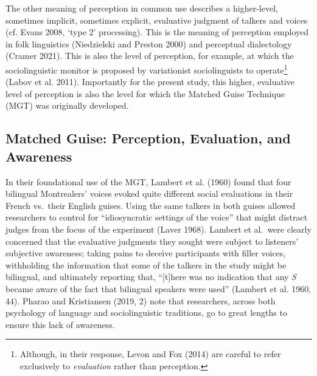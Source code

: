 \documentclass[
  letterpaper,
  DIV=11,
  numbers=noendperiod]{scrartcl}
\begin{document}
The other meaning of perception in common use describes a higher-level,
sometimes implicit, sometimes explicit, evaluative judgment of talkers
and voices (cf. Evans 2008, `type 2' processing). This is the meaning of
perception employed in folk linguistics (Niedzielski and Preston 2000)
and perceptual dialectology (Cramer 2021). This is also the level of
perception, for example, at which the sociolinguistic monitor is
proposed by variationist sociolinguists to operate\footnote{Although, in
  their response, Levon and Fox (2014) are careful to refer exclusively
  to \emph{evaluation} rather than perception.} (Labov et al. 2011).
Importantly for the present study, this higher, evaluative level of
perception is also the level for which the Matched Guise Technique (MGT)
was originally developed.

\subsection{Matched Guise: Perception, Evaluation, and
Awareness}\label{sec-mgt}

In their foundational use of the MGT, Lambert et al. (1960) found that
four bilingual Montrealers' voices evoked quite different social
evaluations in their French vs.~their English guises. Using the same
talkers in both guises allowed researchers to control for
``idiosyncratic settings of the voice'' that might distract judges from
the focus of the experiment (Laver 1968). Lambert et al.~were clearly
concerned that the evaluative judgments they sought were subject to
listeners' subjective awareness; taking pains to deceive participants
with filler voices, withholding the information that some of the talkers
in the study might be bilingual, and ultimately reporting that,
``{[}t{]}here was no indication that any \emph{S} became aware of the
fact that bilingual speakers were used'' (Lambert et al. 1960, 44).
Pharao and Kristiansen (2019, 2) note that researchers, across both
psychology of language and sociolinguistic traditions, go to great
lengths to ensure this lack of awareness.
\end{document}
